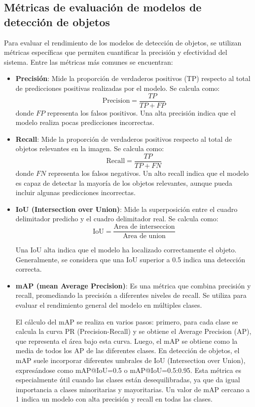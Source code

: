 \documentclass[11pt,spanish,listoffigures,listoftables]{tfgetsinf}
\begin{document}
\subsection{Métricas de evaluación de modelos de detección de objetos} \label{sec:metricas_evaluacion}

Para evaluar el rendimiento de los modelos de detección de objetos, se utilizan métricas específicas que permiten cuantificar la precisión y efectividad del sistema. Entre las métricas más comunes se encuentran:

\begin{itemize}
   \item \textbf{Precisión}: Mide la proporción de verdaderos positivos (TP) respecto al total de predicciones positivas realizadas por el modelo. Se calcula como:
   \[
   \text{Precision} = \frac{TP}{TP + FP}
   \]
   donde $FP$ representa los falsos positivos. Una alta precisión indica que el modelo realiza pocas predicciones incorrectas.

   \item \textbf{Recall}: Mide la proporción de verdaderos positivos respecto al total de objetos relevantes en la imagen. Se calcula como:
   \[
   \text{Recall} = \frac{TP}{TP + FN}
   \]
   donde $FN$ representa los falsos negativos. Un alto recall indica que el modelo es capaz de detectar la mayoría de los objetos relevantes, aunque pueda incluir algunas predicciones incorrectas.

   \item \textbf{IoU (Intersection over Union)}: Mide la superposición entre el cuadro delimitador predicho y el cuadro delimitador real. Se calcula como:
   \[
   \text{IoU} = \frac{\text{Area de interseccion}}{\text{Area de union}}
   \]

   Una IoU alta indica que el modelo ha localizado correctamente el objeto. Generalmente, se considera que una IoU superior a 0.5 indica una detección correcta.

   \item \textbf{mAP (mean Average Precision)}: Es una métrica que combina precisión y recall, promediando la precisión a diferentes niveles de recall. Se utiliza para evaluar el rendimiento general del modelo en múltiples clases. 
   
   El cálculo del mAP se realiza en varios pasos: primero, para cada clase se calcula la curva PR (Precision-Recall) y se obtiene el Average Precision (AP), que representa el área bajo esta curva. Luego, el mAP se obtiene como la media de todos los AP de las diferentes clases. En detección de objetos, el mAP suele incorporar diferentes umbrales de IoU (Intersection over Union), expresándose como mAP@IoU=0.5 o mAP@IoU=0.5:0.95. Esta métrica es especialmente útil cuando las clases están desequilibradas, ya que da igual importancia a clases minoritarias y mayoritarias. Un valor de mAP cercano a 1 indica un modelo con alta precisión y recall en todas las clases.


\end{itemize}
\end{document}
